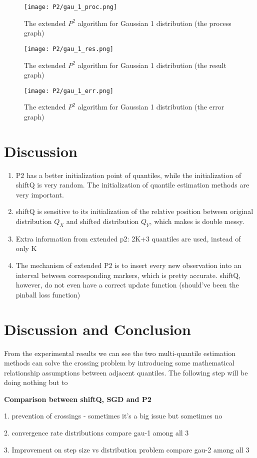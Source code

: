 \begin{figure}[h!]
	\texttt{[image: P2/gau\_1\_proc.png]}
    \caption{The extended $P^2$ algorithm for Gaussian 1 distribution (the process graph)}
    \label{fig: p2_proc}
\end{figure}

\begin{figure}[h!]
	\texttt{[image: P2/gau\_1\_res.png]}
	\caption{The extended $P^2$ algorithm for Gaussian 1 distribution (the result graph)}
    \label{fig: p2_res}
\end{figure}

\begin{figure}[h!]
	\texttt{[image: P2/gau\_1\_err.png]}
    \caption{The extended $P^2$ algorithm for Gaussian 1 distribution (the error graph)}
    \label{fig: p2_err}
\end{figure}

\section{Discussion}
\begin{enumerate}
    \item  P2 has a better initialization point of quantiles, while the initialization of shiftQ is very random. The initialization of quantile estimation methods are very important.
    \item shiftQ is sensitive to its initialization of the relative position between original distribution $Q_X$ and shifted distribution $Q_Y$, which makes is double messy.
    \item Extra information from extended p2: 2K+3 quantiles are used, instead of only K
    \item The mechanism of extended P2 is to insert every new observation into an interval between corresponding markers, which is pretty accurate. shiftQ, however, do not even have a correct update function (should've been the pinball loss function)
\end{enumerate}

\section{Discussion and Conclusion}
\label{sec: multi_discussion}

From the experimental results we can see the two multi-quantile estimation methods can solve the crossing problem by introducing some mathematical relationship assumptions between adjacent quantiles. The following step will be doing nothing but to 

\textbf{Comparison between shiftQ, SGD and P2}

1. prevention of crossings - sometimes it's a big issue but sometimes no

2. convergence rate distributions
    compare gau-1 among all 3

3. Improvement on step size vs distribution problem
    compare gau-2 among all 3